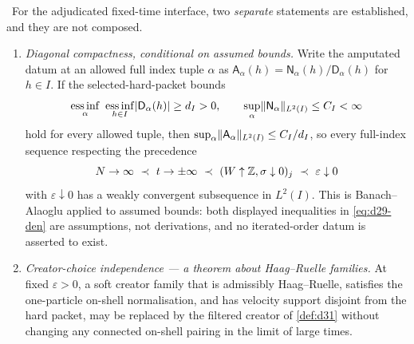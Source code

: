 \begin{theorem}
\label{thm:d29-interface}
\statusSketch\ For the adjudicated fixed-time interface, two \emph{separate}
statements are established, and they are not composed.
\begin{enumerate}
\item \emph{Diagonal compactness, conditional on assumed bounds.} Write the
  amputated datum at an allowed full index tuple $\alpha$ as
  $\mathsf{A}_\alpha(h)=\mathsf{N}_\alpha(h)/\mathsf{D}_\alpha(h)$ for $h\in I$.
  If the selected-hard-packet bounds
  \begin{equation}
    \operatorname*{ess\,inf}_\alpha\ \operatorname*{ess\,inf}_{h\in I}
      \abs{\mathsf{D}_\alpha(h)}\ge d_I>0,
    \qquad
    \sup_\alpha\norm{\mathsf{N}_\alpha}_{L^2(I)}\le C_I<\infty
    \label{eq:d29-den}
  \end{equation}
  hold for every allowed tuple, then $\sup_\alpha\lVert \mathsf{A}_\alpha\rVert_{L^2(I)}\le C_I/d_I$,
  so every full-index sequence respecting the precedence
  \begin{equation}
    N\to\infty\ \prec\ t\to\pm\infty\ \prec\ (W\uparrow\Z,\sigma\downarrow0)_j
     \ \prec\ \varepsilon\downarrow0
    \label{eq:d29-order}
  \end{equation}
  with $\varepsilon\downarrow0$ has a weakly convergent subsequence in
  $L^2(I)$. This is Banach--Alaoglu applied to assumed bounds: both displayed
  inequalities in \cref{eq:d29-den} are assumptions, not derivations, and no
  iterated-order datum is asserted to exist.
\item \emph{Creator-choice independence --- a theorem about Haag--Ruelle
  families.} At fixed $\varepsilon>0$, a soft creator family that is
  admissibly Haag--Ruelle, satisfies the one-particle on-shell normalisation,
  and has velocity support disjoint from the hard packet, may be replaced by
  the filtered creator of \cref{def:d31} without changing any connected
  on-shell pairing in the limit of large times.
\end{enumerate}
\end{theorem}
